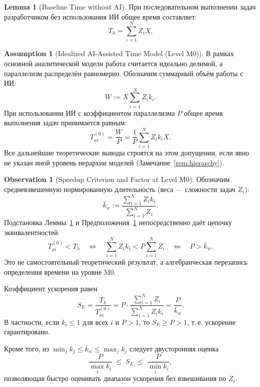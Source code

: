 \documentclass[12pt,a4paper]{article}
\theoremstyle{definition}
\newtheorem{assumption}{Assumption}
\newtheorem{lemma}{Lemma}
\newtheorem{observation}{Observation}
\begin{document}
\begin{lemma}[Baseline Time without AI]\label{lem:baseline}
При последовательном выполнении задач разработчиком без использования ИИ общее время составляет:
\begin{equation}
  T_h = \sum_{i=1}^{N} Z_i X.
\end{equation}
\end{lemma}

\begin{assumption}[Idealized AI-Assisted Time Model (Level M0)]\label{assum:ideal}
В рамках основной аналитической модели работа считается идеально делимой, а параллелизм распределён равномерно. Обозначим суммарный объём работы с ИИ:
\[
  W := X \sum_{i=1}^{N} Z_i k_i.
\]
При использовании ИИ с коэффициентом параллелизма $P$ общее время выполнения задач принимается равным:
\begin{equation}
  T_{ai}^{(0)} = \frac{W}{P} = \frac{1}{P} \sum_{i=1}^{N} Z_i k_i X.
\end{equation}
Все дальнейшие теоретические выводы строятся на этом допущении, если явно не указан иной уровень иерархии моделей (Замечание~\ref{rem:hierarchy}).
\end{assumption}

\begin{observation}[Speedup Criterion and Factor at Level M0]\label{obs:ideal}
Обозначим средневзвешенную нормированную длительность (веса --- сложности задач $Z_i$):
\[
  \bar{k}_w := \frac{\sum_{i=1}^{N} Z_i k_i}{\sum_{i=1}^{N} Z_i}.
\]
Подстановка Леммы~\ref{lem:baseline} и Предположения~\ref{assum:ideal} непосредственно даёт цепочку эквивалентностей
\begin{equation}
  T_{ai}^{(0)} < T_h
  \quad\Longleftrightarrow\quad
  \sum_{i=1}^{N} Z_i k_i < P \sum_{i=1}^{N} Z_i
  \quad\Longleftrightarrow\quad
  P > \bar{k}_w.
\end{equation}
Это не самостоятельный теоретический результат, а алгебраическая перезапись определения времени на уровне M0.

Коэффициент ускорения равен
\begin{equation}
  S_E = \frac{T_h}{T_{ai}^{(0)}} = P \cdot \frac{\sum_{i=1}^{N} Z_i}{\sum_{i=1}^{N} Z_i k_i} = \frac{P}{\bar{k}_w}.
\end{equation}
В частности, если $k_i \le 1$ для всех $i$ и $P > 1$, то $S_E \ge P > 1$, т.\,е. ускорение гарантировано.

\medskip
Кроме того, из $\min_{j} k_j \le \bar{k}_w \le \max_{j} k_j$ следует двусторонняя оценка
\[
  \frac{P}{\max_{i} k_i} \;\le\; S_E \;\le\; \frac{P}{\min_{i} k_i},
\]
позволяющая быстро оценивать диапазон ускорения без взвешивания по $Z_i$.
\end{observation}
\end{document}
